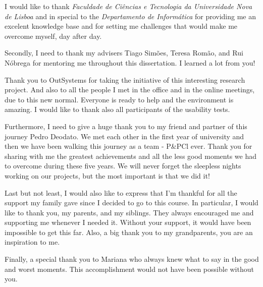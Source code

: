 \acknowledgements

I would like to thank \textit{Faculdade de Ciências e Tecnologia da Universidade Nova de Lisboa} and in special to the \textit{Departamento de Informática} for providing me an excelent knowledge base and for setting me challenges that would make me overcome myself, day after day.

Secondly, I need to thank my advisers Tiago Simões, Teresa Romão, and Rui Nóbrega for mentoring me throughout this dissertation. I learned a lot from you!  

Thank you to OutSystems for taking the initiative of this interesting research project. And also to all the people I met in the office and in the online meetings, due to this new normal. Everyone is ready to help and the environment is amazing. I would like to thank also all participants of the usability tests.

Furthermore, I need to give a huge thank you to my friend and partner of this journey Pedro Deodato. We met each other in the first year of university and then we have been walking this journey as a team - P\&PCl ever. Thank you for sharing with me the greatest achievements and all the less good moments we had to overcome during these five years. We will never forget the sleepless nights working on our projects, but the most important is that we did it!

Last but not least, I would also like to express that I'm thankful for all the support my family gave since I decided to go to this course. In particular, I would like to thank you, my parents, and my siblings. They always encouraged me and supporting me whenever I needed it. Without your support, it would have been impossible to get this far. Also, a big thank you to my grandparents, you are an inspiration to me.

Finally, a special thank you to Mariana who always knew what to say in the good and worst moments. This accomplishment would not have been possible without you.

